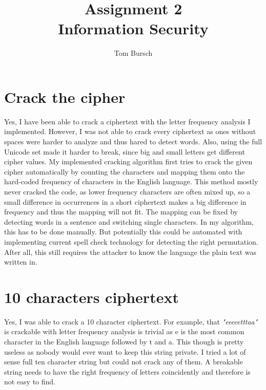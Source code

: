 \documentclass[12pt]{article}
\title{Assignment 2\\\textbf{\large{Information Security}}}
\author{Tom Bursch}
\begin{document}
\maketitle
\section*{Crack the cipher}
Yes, I have been able to crack a ciphertext with the letter frequency analysis I implemented. However, I was not able to crack every ciphertext as ones without spaces were harder to analyze and thus hared to detect words. Also, using the full Unicode set made it harder to break, since big and small letters get different cipher values.
My implemented cracking algorithm first tries to crack the given cipher automatically by counting the characters and mapping them onto the hard-coded frequency of characters in the English language. This method mostly never cracked the code, as lower frequency characters are often mixed up, so a small difference in occurrences in a short ciphertext makes a big difference in frequency and thus the mapping will not fit. The mapping can be fixed by detecting words in a sentence and switching single characters. In my algorithm, this has to be done manually. But potentially this could be automated with implementing current spell check technology for detecting the right permutation. After all, this still requires the attacker to know the language the plain text was written in.
\section*{10 characters ciphertext}
Yes, I was able to crack a 10 character ciphertext. For example, that \emph{"eeeeetttaa"} is crackable with letter frequency analysis is trivial as e is the most common character in the English language followed by t and a. This though is pretty useless as nobody would ever want to keep this string private. I tried a lot of sense full ten character string but could not crack any of them. A breakable string needs to have the right frequency of letters coincidently and therefore is not easy to find.
\end{document}
